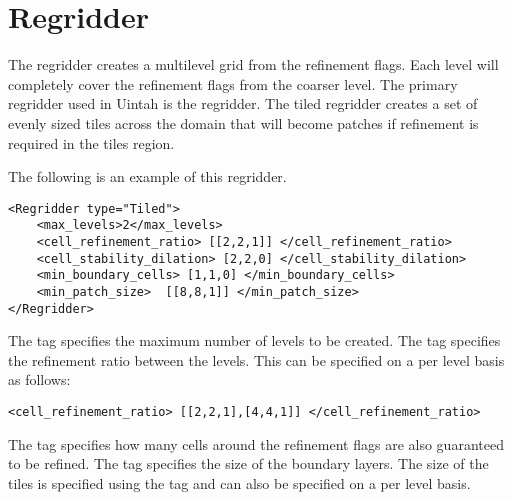 %
%


\section{Regridder}

The regridder creates a multilevel grid from the refinement flags.
Each level will completely cover the refinement flags from the coarser
level.  The primary regridder used in Uintah is the  regridder.
The tiled regridder creates a set of evenly sized tiles across the domain
that will become patches if refinement is required in the tiles region.

The following is an example of this regridder.

\begin{Verbatim}[fontsize=\footnotesize]
<Regridder type="Tiled">
    <max_levels>2</max_levels>
    <cell_refinement_ratio> [[2,2,1]] </cell_refinement_ratio>
    <cell_stability_dilation> [2,2,0] </cell_stability_dilation>
    <min_boundary_cells> [1,1,0] </min_boundary_cells>
    <min_patch_size>  [[8,8,1]] </min_patch_size>
</Regridder>
\end{Verbatim}

The  tag specifies the maximum number of levels
to be created.  The  tag specifies the
refinement ratio between the levels.  This can be specified on a per
level basis as follows:

\begin{Verbatim}[fontsize=\footnotesize]
    <cell_refinement_ratio> [[2,2,1],[4,4,1]] </cell_refinement_ratio>
\end{Verbatim}

The  tag specifies how many cells around
the refinement flags are also guaranteed to be refined.  The
 tag specifies the size of the boundary layers.
The size of the tiles is specified using the  tag
and can also be specified on a per level basis.

%


